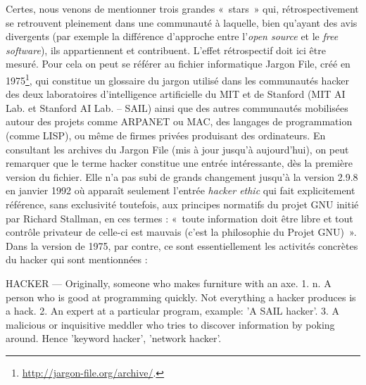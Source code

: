 \documentclass{FramateX}
\begin{document}
\begin{refsection}
Certes, nous venons de mentionner trois grandes «~stars~» qui,
rétrospectivement se retrouvent pleinement dans une communauté à
laquelle, bien qu'ayant des avis divergents (par
exemple la différence d'approche entre
l'\textit{open source} et le \textit{free software}),
ils appartiennent et contribuent. L'effet
rétrospectif doit ici être mesuré. Pour cela on peut se référer au
fichier informatique Jargon File, créé en
1975\footnote{\url{http://jargon-file.org/archive/}.}, qui constitue un
glossaire du jargon utilisé dans les communautés hacker des deux
laboratoires d'intelligence artificielle du MIT et de
Stanford (MIT AI Lab. et Stanford AI Lab. -- SAIL) ainsi que des
autres communautés mobilisées autour des projets comme ARPANET ou
MAC, des langages de programmation (comme LISP), ou même de firmes
privées produisant des ordinateurs. En consultant les archives du
Jargon File (mis à jour jusqu'à
aujourd'hui), on peut remarquer que le terme hacker
constitue une entrée intéressante, dès la première version du fichier.
Elle n'a pas subi de grands changement
jusqu'à la version 2.9.8 en janvier 1992 où apparaît
seulement l'entrée \textit{hacker ethic} qui fait
explicitement référence, sans exclusivité toutefois, aux principes
normatifs du projet GNU initié par Richard Stallman, en ces termes :
«~toute information doit être libre et tout contrôle privateur de
celle-ci est mauvais (c'est la philosophie du Projet
GNU)~». Dans la version de 1975, par contre, ce sont essentiellement
les activités concrètes du hacker qui sont mentionnées :

\begin{encart}
HACKER --- Originally, someone who makes furniture with an axe. 1. n. A person who is good at programming quickly. Not everything a hacker produces is a hack. 2. An expert at a particular program, example: 'A SAIL hacker'. 3. A malicious or inquisitive meddler who tries to discover information by poking around. Hence
'keyword hacker',
'network hacker'.
\end{encart}


\end{refsection}
\end{document}
